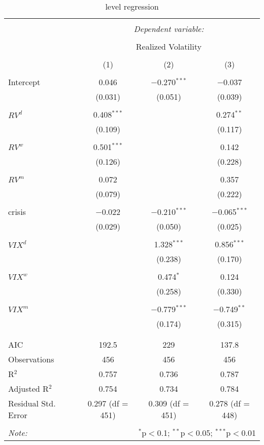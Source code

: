 
\begin{table}[!htbp] \centering 
  \caption{level regression} 
  \label{} 
\begin{tabular}{@{\extracolsep{5pt}}lccc} 
\\[-1.8ex]\hline 
\hline \\[-1.8ex] 
 & \multicolumn{3}{c}{\textit{Dependent variable:}} \\ 
\cline{2-4} 
\\[-1.8ex] & \multicolumn{3}{c}{Realized Volatility} \\ 
\\[-1.8ex] & (1) & (2) & (3)\\ 
\hline \\[-1.8ex] 
 Intercept & 0.046 & $-$0.270$^{***}$ & $-$0.037 \\ 
  & (0.031) & (0.051) & (0.039) \\ 
  & & & \\ 
 $RV^{d}$ & 0.408$^{***}$ &  & 0.274$^{**}$ \\ 
  & (0.109) &  & (0.117) \\ 
  & & & \\ 
 $RV^{w}$ & 0.501$^{***}$ &  & 0.142 \\ 
  & (0.126) &  & (0.228) \\ 
  & & & \\ 
 $RV^{m}$ & 0.072 &  & 0.357 \\ 
  & (0.079) &  & (0.222) \\ 
  & & & \\ 
 crisis & $-$0.022 & $-$0.210$^{***}$ & $-$0.065$^{***}$ \\ 
  & (0.029) & (0.050) & (0.025) \\ 
  & & & \\ 
 $VIX^{d}$ &  & 1.328$^{***}$ & 0.856$^{***}$ \\ 
  &  & (0.238) & (0.170) \\ 
  & & & \\ 
 $VIX^{w}$ &  & 0.474$^{*}$ & 0.124 \\ 
  &  & (0.258) & (0.330) \\ 
  & & & \\ 
 $VIX^{m}$ &  & $-$0.779$^{***}$ & $-$0.749$^{**}$ \\ 
  &  & (0.174) & (0.315) \\ 
  & & & \\ 
\hline \\[-1.8ex] 
AIC & 192.5 & 229 & 137.8 \\ 
Observations & 456 & 456 & 456 \\ 
R$^{2}$ & 0.757 & 0.736 & 0.787 \\ 
Adjusted R$^{2}$ & 0.754 & 0.734 & 0.784 \\ 
Residual Std. Error & 0.297 (df = 451) & 0.309 (df = 451) & 0.278 (df = 448) \\ 
\hline 
\hline \\[-1.8ex] 
\textit{Note:}  & \multicolumn{3}{r}{$^{*}$p$<$0.1; $^{**}$p$<$0.05; $^{***}$p$<$0.01} \\ 
\end{tabular} 
\end{table} 

